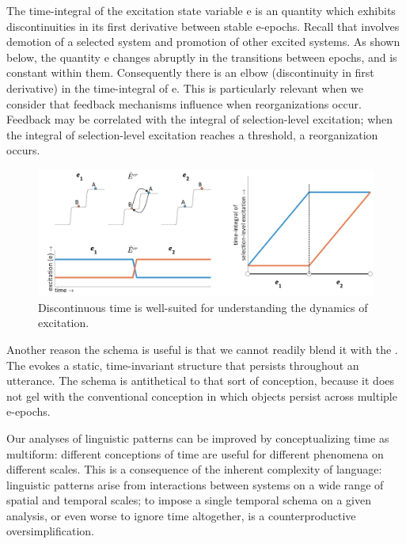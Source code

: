   The time-integral of the excitation state variable e is an  quantity which exhibits discontinuities in its first derivative between stable e-epochs. Recall that  involves demotion of a selected system and promotion of other excited systems. As shown below, the  quantity e changes abruptly in the transitions between epochs, and is constant within them. Consequently there is an elbow (discontinuity in first derivative) in the time-integral of e. This is particularly relevant when we consider that feedback mechanisms influence when reorganizations occur. Feedback may be correlated with the integral of selection-level excitation; when the integral of selection-level excitation reaches a threshold, a reorganization occurs.

  
\begin{figure}
\includegraphics[width=\textwidth]{figures/Tilsen-img50.png}
\caption{Discontinuous time is well-suited for understanding the dynamics of excitation.}
\label{fig:3:22}
\end{figure}
 

  Another reason the  schema is useful is that we cannot readily blend it with the {}. The  evokes a static, time-invariant structure that persists throughout an utterance. The  schema is antithetical to that sort of conception, because it does not gel with the conventional conception in which objects persist across multiple e-epochs. 

  Our analyses of linguistic patterns can be improved by conceptualizing time as multiform: different conceptions of time are useful for different phenomena on different scales. This is a consequence of the inherent complexity of language: linguistic patterns arise from interactions between systems on a wide range of spatial and temporal scales; to impose a single temporal schema on a given analysis, or even worse to ignore time altogether, is a counterproductive oversimplification. 

